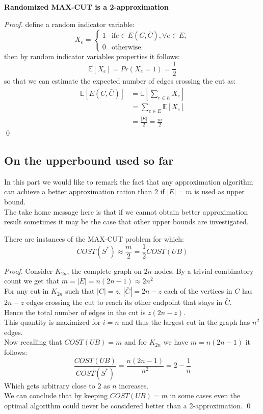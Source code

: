 \begin{theorem}{} 
	\textbf{Randomized MAX-CUT is a 2-approximation}
\end{theorem}
\begin{proof}
	define a random indicator variable:
\begin{equation*}
	X_{e} = 
	  \begin{cases}
	    1 &  \text{if} e \in E(C,\bar{C}), \forall e \in E,\\
        0 &  \text{otherwise}.
	  \end{cases}
\end{equation*}
then by random indicator variables properties it follows:
\[ \mathbb{E}[X_{e}] = Pr(X_{e} = 1) = \frac{1}{2} \]
so that we can estimate the expected number of edges crossing the cut as:
\begin{align*}
\mathbb{E}[E(C,\bar{C})] & = \mathbb{E}[\sum_{e \in E} X_{e}] \\
						 & = \sum_{e \in E} \mathbb{E}[X_{e}] \\
						 & = \frac{|E|}{2} = \frac{m}{2}
\end{align*}
\qed
\end{proof}


\subsection{On the upperbound used so far}
In this part we would like to remark the fact that any approximation algorithm can achieve a better approximation ration than $ 2 $ if $ |E|=m $ is used as upper bound.\\
The take home message here is that if we cannot obtain better approximation result sometimes it may be the case that other upper bounds are investigated.
\begin{claim}
	There are instances of the MAX-CUT problem for which:
	\[COST(S^{*}) \approx \frac{m}{2} = \frac{1}{2} COST(UB) \]
\end{claim}
\begin{proof}
Consider $ K_{2n} $, the complete graph on $ 2n $ nodes. By a trivial combinatory count we get that $ m = |E|= n(2n-1) \approx 2n^2 $\\
For any cut in $ K_{2n} $ such that $ |C|= z $, $ |\bar{C}|= 2n-z $ each of the vertices in $ C $ has $ 2n-z $ edges crossing the cut to reach its other endpoint that stays in $ \bar{C} $.\\
Hence the total number of edges in the cut is $ z(2n-z) $.\\
This quantity is maximized for $ i=n $ and thus the largest cut in the graph has $ n^2 $ edges.\\
Now recalling that $ COST(UB)=m $ and for $ K_{2n} $ we have $ m=n(2n-1) $ it follows:
\[ \frac{COST(UB)}{COST(S^{*})} = \frac{n(2n-1)}{n^2} = 2 - \frac{1}{n}  \]
Which gets arbitrary close to $ 2 $ as $ n $ increases. \\
We can conclude that by keeping $ COST(UB)=m $ in some cases even the optimal algorithm could never be considered better than a 2-approximation.
\qed
\end{proof}

